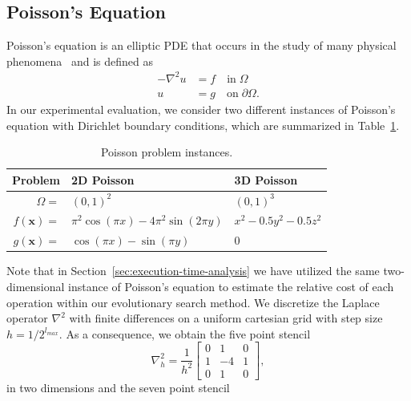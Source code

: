 \subsection{Poisson's Equation}
\label{sec:poisson-equation}
Poisson's equation is an elliptic PDE that occurs in the study of many physical phenomena~\cite{folland2020introduction} and is defined as
\begin{equation}
	\begin{split}
		-\nabla^{2} u & = f \quad \text{in} \; \Omega \\
		u & = g \quad \text{on} \; \partial \Omega.
	\end{split}
	\label{eq:poisson}
\end{equation}
In our experimental evaluation, we consider two different instances of Poisson's equation with Dirichlet boundary conditions, which are summarized in Table~\ref{table:poisson-problems}.
\begin{table}
	\begin{tabular}{r l l}
		\toprule
		Problem & 2D Poisson & 3D Poisson \\
		\midrule
		$\Omega = $ & $ (0, 1)^2$ & $(0, 1)^3$ \\
		\midrule
		$f(\mathbf{x}) = $ & $\pi^2 \cos(\pi x) - 4 \pi^2 \sin(2 \pi y)$ & $x^2 - 0.5 y^2 - 0.5 z^2$ \\
		\midrule
		$g(\mathbf{x}) = $ & $\cos(\pi x) - \sin(\pi y)$ & $0$ \\
		\bottomrule
	\end{tabular}
	\caption{Poisson problem instances.}
	\label{table:poisson-problems}
\end{table}
Note that in Section~\ref{sec:execution-time-analysis} we have utilized the same two-dimensional instance of Poisson's equation to estimate the relative cost of each operation within our evolutionary search method.
We discretize the Laplace operator $\nabla^{2}$ with finite differences on a uniform cartesian grid with step size $h = 1/2^{l_{max}}$.
As a consequence, we obtain the five point stencil
\begin{equation*}
	\nabla^2_h = 
	\frac{1}{h^2} \begin{bmatrix}
		0 & 1 & 0\\
		1 & -4 & 1 \\
		0 & 1 & 0  
	\end{bmatrix},
\end{equation*}
in two dimensions and the seven point stencil
